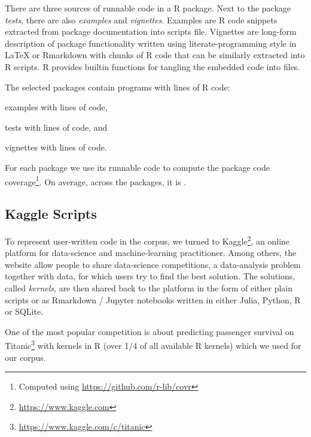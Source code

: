 \documentclass[conference]{IEEEtran}
\begin{document}
There are three sources of runnable code in a R package. Next to the package
\emph{tests}, there are also \emph{examples} and \emph{vignettes}. Examples are
R code snippets extracted from package documentation into scripts file.
Vignettes are long-form description of package functionality written using
literate-programming style in \LaTeX\xspace or Rmarkdown with chunks of R code
that can be similarly extracted into R scripts. R provides builtin functions for
tangling the embedded code into files.

The selected packages contain \CorpusPackagePrograms programs with
\CorpusPackageProgramsCodeRnd lines of R code:
%
\begin{compactitem}[$-$]
  \item \CorpusExamplesProgramsRnd examples with \CorpusExamplesCodeRnd
   lines of code,
  \item \CorpusTestsProgramsRnd tests with \CorpusTestsCodeRnd
   lines of code, and
  \item \CorpusVignettesProgramsRnd vignettes with \CorpusVignettesCodeRnd
   lines of code.
\end{compactitem}

For each package we use its runnable code to compute the package code
coverage\footnote{Computed using \url{ https://github.com/r-lib/covr}}. On
average, across the \CorpusPackages packages, it is \CorpusMeanExprCoverage.

\subsection{Kaggle Scripts}

To represent user-written code in the corpus, we turned to
Kaggle\footnote{\url{https://www.kaggle.com}}, an online platform for
data-science and machine-learning practitioner. Among others, the website allow
people to share data-science competitions, a data-analysis problem together with
data, for which users try to find the best solution. The solutions, called
\emph{kernels}, are then shared back to the platform in the form of either plain
scripts or as Rmarkdown / Jupyter notebooks written in either Julia, Python, R
or SQLite.

One of the most popular competition is about predicting passenger survival on
Titanic\footnote{\url{https://www.kaggle.com/c/titanic}} with \CorpusKaggle
kernels in R (over 1/4 of all available R kernels) which we used for our corpus.
\end{document}
